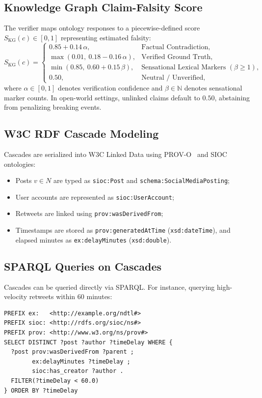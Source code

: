 \documentclass[10pt,twocolumn,a4paper]{article}
\newcommand{\SKG}{S_{\mathrm{KG}}}
\begin{document}
\subsection{Knowledge Graph Claim-Falsity Score}
The verifier maps ontology responses to a piecewise-defined score $\SKG(c)\in[0,1]$ representing estimated falsity:
\begin{equation}
\SKG(c)=
\begin{cases}
0.85+0.14\,\alpha, & \text{Factual Contradiction},\\
\max(0.01,\ 0.18-0.16\,\alpha), & \text{Verified Ground Truth},\\
\min(0.85,\ 0.60+0.15\,\beta), & \text{Sensational Lexical Markers } (\beta \ge 1),\\
0.50, & \text{Neutral / Unverified},
\end{cases}
\end{equation}
where $\alpha\in[0,1]$ denotes verification confidence and $\beta\in\mathbb{N}$ denotes sensational marker counts. In open-world settings, unlinked claims default to $0.50$, abstaining from penalizing breaking events.
 
\subsection{W3C RDF Cascade Modeling}
Cascades are serialized into W3C Linked Data using PROV-O~\cite{lebo2013} and SIOC ontologies:
\begin{itemize}
  \item Posts $v\in N$ are typed as \texttt{sioc:Post} and \texttt{schema:SocialMediaPosting};
  \item User accounts are represented as \texttt{sioc:UserAccount};
  \item Retweets are linked using \texttt{prov:wasDerivedFrom};
  \item Timestamps are stored as \texttt{prov:generatedAtTime} (\texttt{xsd:dateTime}), and elapsed minutes as \texttt{ex:delayMinutes} (\texttt{xsd:double}).
\end{itemize}
 
\subsection{SPARQL Queries on Cascades}
Cascades can be queried directly via SPARQL. For instance, querying high-velocity retweets within 60 minutes:
\begin{lstlisting}[caption={SPARQL cascade query for early retweets.},label={lst:cascade}]
PREFIX ex:   <http://example.org/ndtl#>
PREFIX sioc: <http://rdfs.org/sioc/ns#>
PREFIX prov: <http://www.w3.org/ns/prov#>
SELECT DISTINCT ?post ?author ?timeDelay WHERE {
  ?post prov:wasDerivedFrom ?parent ;
        ex:delayMinutes ?timeDelay ;
        sioc:has_creator ?author .
  FILTER(?timeDelay < 60.0)
} ORDER BY ?timeDelay
\end{lstlisting}
 
\end{document}
